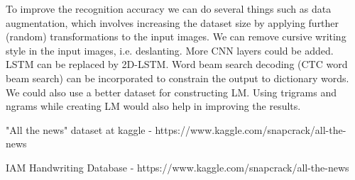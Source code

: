 \documentclass[a4paper, 10pt,twocolumn]{article}
\begin{document}
To improve the recognition accuracy we can do several things such as data augmentation, which involves increasing the dataset size by applying further (random) transformations to the input images. We can remove cursive writing style in the input images, i.e. deslanting. More CNN layers could be added. LSTM can be replaced by 2D-LSTM. Word beam search decoding (CTC word beam search) can be incorporated to constrain the output to dictionary words. We could also use a better dataset for constructing LM. Using trigrams and ngrams while creating LM would also help in improving the results.

\begin{thebibliography}{9}


 "All the news" dataset at kaggle - https://www.kaggle.com/snapcrack/all-the-news

 IAM Handwriting Database - https://www.kaggle.com/snapcrack/all-the-news


\end{thebibliography}
\end{document}
